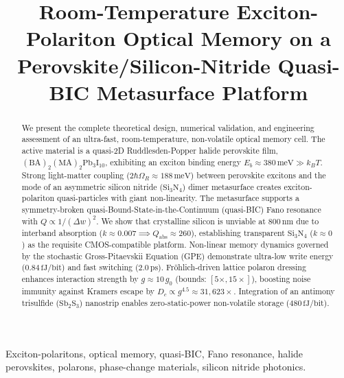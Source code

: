 \documentclass[10pt, conference]{IEEEtran}
\begin{document}
\title{Room-Temperature Exciton-Polariton Optical Memory on a Perovskite/Silicon-Nitride Quasi-BIC Metasurface Platform}

\author{
}

\maketitle

\begin{abstract}
We present the complete theoretical design, numerical validation, and engineering assessment of an ultra-fast, room-temperature, non-volatile optical memory cell. The active material is a quasi-2D Ruddlesden-Popper halide perovskite film, $(\text{BA})_2(\text{MA})_2\text{Pb}_3\text{I}_{10}$, exhibiting an exciton binding energy $E_b \approx 380\,\text{meV} \gg k_B T$. Strong light-matter coupling ($2\hbar\Omega_R \approx 188\,\text{meV}$) between perovskite excitons and the mode of an asymmetric silicon nitride ($\text{Si}_3\text{N}_4$) dimer metasurface creates exciton-polariton quasi-particles with giant non-linearity. The metasurface supports a symmetry-broken quasi-Bound-State-in-the-Continuum (quasi-BIC) Fano resonance with $Q \propto 1/(\Delta w)^2$. We show that crystalline silicon is unviable at $800\,\text{nm}$ due to interband absorption ($k \approx 0.007 \implies Q_{\text{abs}} \approx 260$), establishing transparent $\text{Si}_3\text{N}_4$ ($k \approx 0$) as the requisite CMOS-compatible platform. Non-linear memory dynamics governed by the stochastic Gross-Pitaevskii Equation (GPE) demonstrate ultra-low write energy ($0.84\,\text{fJ/bit}$) and fast switching ($2.0\,\text{ps}$). Fr\"ohlich-driven lattice polaron dressing enhances interaction strength by $g \approx 10\,g_0$ (bounds: $[5\times, 15\times]$), boosting noise immunity against Kramers escape by $D_c \propto g^{4.5} \approx 31{,}623\times$. Integration of an antimony trisulfide ($\text{Sb}_2\text{S}_3$) nanostrip enables zero-static-power non-volatile storage ($480\,\text{fJ/bit}$).
\end{abstract}

\begin{IEEEkeywords}
Exciton-polaritons, optical memory, quasi-BIC, Fano resonance, halide perovskites, polarons, phase-change materials, silicon nitride photonics.
\end{IEEEkeywords}
\end{document}

